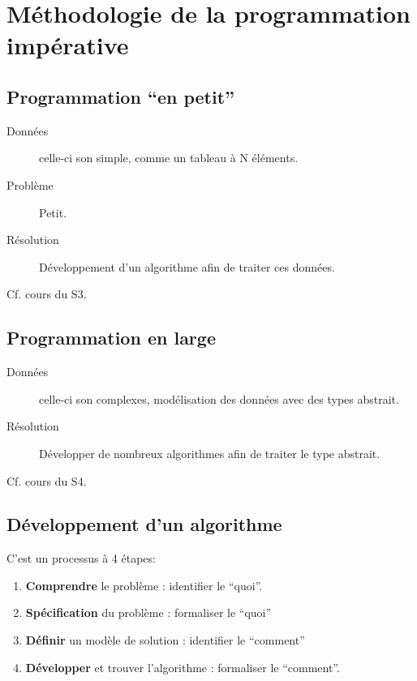 \chapter{Méthodologie de la programmation impérative}
	\section{Programmation ``en petit''}
	\begin{description}
		\item[Données] celle-ci son simple, comme un tableau à N éléments.
		\item[Problème] Petit.
		\item[Résolution] Développement d'un algorithme afin de traiter ces données.
	\end{description}
	Cf. cours du S3.

	\section{Programmation en large}
	\begin{description}
		\item[Données] celle-ci son complexes, modélisation des données avec des types abstrait.
		\item[Résolution] Développer de nombreux algorithmes afin de traiter le type abstrait. 
	\end{description}
	Cf. cours du S4.
	\section{Développement d'un algorithme}
	C'est un processus à 4 étapes:
	\begin{enumerate}
		\item \textbf{Comprendre} le problème : identifier le ``quoi''.
		\item \textbf{Spécification} du problème : formaliser le ``quoi''
		\item \textbf{Définir} un modèle de solution : identifier le ``comment''
		\item \textbf{Développer} et trouver l'algorithme : formaliser le ``comment''.
	\end{enumerate}


